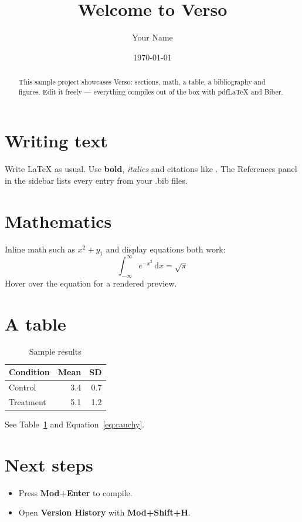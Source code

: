 \documentclass[11pt]{article}
\title{Welcome to Verso}
\author{Your Name}
\date{\today}
\begin{document}
\maketitle

\begin{abstract}
This sample project showcases Verso: sections, math, a table, a bibliography and
figures. Edit it freely --- everything compiles out of the box with pdfLaTeX and Biber.
\end{abstract}

\section{Writing text}
Write LaTeX as usual. Use \textbf{bold}, \textit{italics} and citations like
\cite{knuth1984}. The References panel in the sidebar lists every entry from your
.bib files.

\section{Mathematics}
Inline math such as $x^2 + y_1$ and display equations both work:
\begin{equation}
  \label{eq:cauchy}
  \int_{-\infty}^{\infty} e^{-x^2}\,\mathrm{d}x = \sqrt{\pi}
\end{equation}
Hover over the equation for a rendered preview.

\section{A table}
\begin{table}[ht]
  \centering
  \caption{Sample results}
  \label{tab:results}
  \begin{tabular}{lrr}
    \toprule
    Condition & Mean & SD \\
    \midrule
    Control & 3.4 & 0.7 \\
    Treatment & 5.1 & 1.2 \\
    \bottomrule
  \end{tabular}
\end{table}

See Table~\ref{tab:results} and Equation~\ref{eq:cauchy}.

\section{Next steps}
\begin{itemize}
  \item Press \textbf{Mod+Enter} to compile.
  \item Open \textbf{Version History} with \textbf{Mod+Shift+H}.
\end{itemize}

\printbibliography
\end{document}
